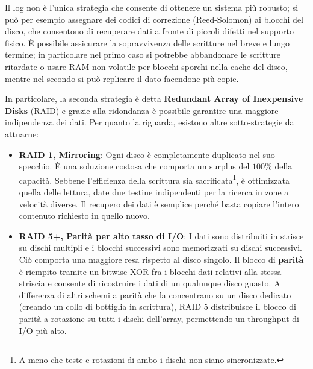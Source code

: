 \noindent Il log non è l'unica strategia che consente di ottenere un sistema più robusto; si può per esempio assegnare dei codici di correzione
(Reed-Solomon) ai blocchi del disco, che consentono di recuperare dati a fronte di piccoli difetti nel supporto fisico. È possibile assicurare la
sopravvivenza delle scritture nel breve e lungo termine; in particolare nel primo caso si potrebbe abbandonare le scritture ritardate o usare RAM non
volatile per blocchi sporchi nella cache del disco, mentre nel secondo si può replicare il dato facendone più copie.\par
In particolare, la seconda strategia è detta \textbf{Redundant Array of Inexpensive Disks} (RAID) e grazie alla ridondanza è possibile garantire una
maggiore indipendenza dei dati. Per quanto la riguarda, esistono altre sotto-strategie da attuarne: \begin{itemize}
    \item \textbf{RAID 1, Mirroring}: Ogni disco è completamente duplicato nel suo specchio. È una soluzione costosa che comporta un surplus del
    $100\%$ della capacità. Sebbene l'efficienza della scrittura sia sacrificata\footnote{A meno che teste e rotazioni di ambo i dischi non siano
    sincronizzate.}, è ottimizzata quella delle lettura, date due testine indipendenti per la ricerca in zone a velocità diverse. Il recupero dei dati è
    semplice perché basta copiare l'intero contenuto richiesto in quello nuovo.
    \item \textbf{RAID 5+, Parità per alto tasso di I/O}: I dati sono distribuiti in strisce su dischi multipli e i blocchi successivi sono memorizzati
    su dischi successivi. Ciò comporta una maggiore resa rispetto al disco singolo. Il blocco di \textbf{parità} è riempito tramite un bitwise XOR fra
    i blocchi dati relativi alla stessa striscia e consente di ricostruire i dati di un qualunque disco guasto. A differenza di altri schemi a parità che
    la concentrano su un disco dedicato (creando un collo di bottiglia in scrittura), RAID 5 distribuisce il blocco di parità a rotazione su tutti i
    dischi dell'array, permettendo un throughput di I/O più alto.
\end{itemize}